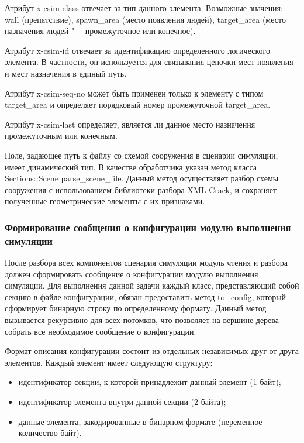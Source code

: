 Атрибут x-csim-class отвечает за тип данного элемента.
Возможные значения:
  wall (препятствие),
  spawn\_area (место появления людей),
  target\_area (место назначения людей "--- промежуточное или конечное).

Атрибут x-csim-id отвечает за идентификацию определенного логического элемента.
В частности, он используется для связывания цепочки мест появления и мест назначения в единый путь.

Атрибут x-csim-seq-no может быть применен только к элементу с типом target\_area и определяет порядковый номер промежуточной target\_area.

Атрибут x-csim-last определяет, является ли данное место назначения промежуточным или конечным.

Поле, задающее путь к файлу со схемой сооружения в сценарии симуляции, имеет динамический тип.
В качестве обработчика указан метод класса Sections::Scene parse\_scene\_file.
Данный метод осуществляет разбор схемы сооружения с использованием библиотеки разбора XML Crack, и сохраняет полученные геометрические элементы с их признаками.

\subsubsection{Формирование сообщения о конфигурации модулю выполнения симуляции}
\label{sec:development:preprocessor:format}

После разбора всех компонентов сценария симуляции модуль чтения и разбора должен сформировать сообщение о конфигурации модулю выполнения симуляции.
Для выполнения данной задачи каждый класс, представляющий собой секцию в файле конфигурации, обязан предоставить метод to\_config, который сформирует бинарную строку по определенному формату.
Данный метод вызывается рекурсивно для всех потомков, что позволяет на вершине дерева собрать все необходимое сообщение о конфигурации.

Формат описания конфигурации состоит из отдельных независимых друг от друга элементов.
Каждый элемент имеет следующую структуру:
\begin{itemize}
  \item идентификатор секции, к которой принадлежит данный элемент (1 байт);
  \item идентификатор элемента внутри данной секции (2 байта);
  \item данные элемента, закодированные в бинарном формате (переменное количество байт).
\end{itemize}

